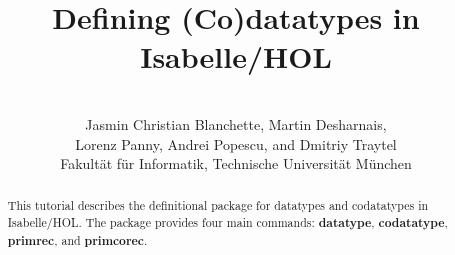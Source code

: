 \documentclass[12pt,a4paper]{article} %
\title{%
Defining (Co)datatypes in Isabelle/HOL}
\author{\hbox{} \\
Jasmin Christian Blanchette,
Martin Desharnais, \\
Lorenz Panny,
Andrei Popescu, and
Dmitriy Traytel \\
{\normalsize Fakult\"at f\"ur Informatik, Technische Universit\"at M\"unchen} \\
\hbox{}}
\renewcommand\_{\hbox{\textunderscore\kern-.05ex}}
\newcommand{\keyw}[1]{\textbf{#1}}
\begin{document}
\maketitle

\begin{abstract}
\noindent
This tutorial describes the definitional package for datatypes and codatatypes
in Isabelle/HOL. The package provides four main commands: \keyw{datatype},
\keyw{codatatype}, \keyw{primrec}, and \keyw{primcorec}.
\end{abstract}

\tableofcontents



\let\em=\sl
{}

\end{document}
